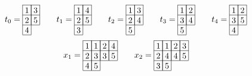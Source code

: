 \[
t_{0}=\begin{array}[c]{*{2}c}\cline{1-2}
\lr{1}&\lr{3}\\\cline{1-2}
\lr{2}&\lr{5}\\\cline{1-2}
\lr{4}\\\cline{1-1}
\end{array}\hspace{20px}
t_{1}=\begin{array}[c]{*{2}c}\cline{1-2}
\lr{1}&\lr{4}\\\cline{1-2}
\lr{2}&\lr{5}\\\cline{1-2}
\lr{3}\\\cline{1-1}
\end{array}
\hspace{20px}
t_{2}=\begin{array}[c]{*{2}c}\cline{1-2}
\lr{1}&\lr{3}\\\cline{1-2}
\lr{2}&\lr{4}\\\cline{1-2}
\lr{5}\\\cline{1-1}
\end{array}
\hspace{20px}
t_{3}=\begin{array}[c]{*{2}c}\cline{1-2}
\lr{1}&\lr{2}\\\cline{1-2}
\lr{3}&\lr{4}\\\cline{1-2}
\lr{5}\\\cline{1-1}
\end{array}
\hspace{20px}
t_{4}=\begin{array}[c]{*{2}c}\cline{1-2}
\lr{1}&\lr{2}\\\cline{1-2}
\lr{3}&\lr{5}\\\cline{1-2}
\lr{4}\\\cline{1-1}
\end{array}
\]
\[
x_1=\begin{array}[c]{*{4}c}\cline{1-4}
\lr{1}&\lr{1}&\lr{2}&\lr{4}\\\cline{1-4}
\lr{2}&\lr{3}&\lr{3}&\lr{5}\\\cline{1-4}
\lr{4}&\lr{5}\\\cline{1-2}
\end{array}
\hspace{20px}
x_2=\begin{array}[c]{*{4}c}\cline{1-4}
\lr{1}&\lr{1}&\lr{2}&\lr{3}\\\cline{1-4}
\lr{2}&\lr{4}&\lr{4}&\lr{5}\\\cline{1-4}
\lr{3}&\lr{5}\\\cline{1-2}
\end{array}
\]
